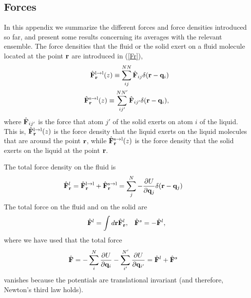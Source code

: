 \documentclass[b5paper,openright,10pt]{book}
\begin{document}
\begin{appendices}
\chapter{Forces}  
\label{Ap:Forces}
In this appendix we summarize the different forces and force densities
introduced so far, and present  some results  concerning its
averages  with the relevant  ensemble.  The  force densities  that the
fluid or the solid exert on a fluid molecule located at the point ${\bf
  r}$ are introduced in (\ref{Fr}),
\begin{eqnarray}
  \hat{\bf F}^{\rm l\to l}_{\bf r}(z) \equiv \sum^{NN}_{ij}\hat{\bf F}_{ij}\delta({\bf r}-{\bf q}_i)
\nonumber\\
\hat{\bf F}^{\rm s\to l}_{\bf r}(z) \equiv \sum^{NN'}_{ij'}\hat{\bf F}_{ij'}\delta({\bf r}-{\bf q}_i),
\label{Fr_ap}
\end{eqnarray}
where $\hat{\bf  F}_{ij'}$ is the  force that  atom $j'$ of  the solid
exerts on  atom $i$ of  the liquid.   This is, $\hat{\bf  F}^{\rm l\to
  l}_{\bf r}(z) $  is the force density that the  liquid exerts on the
liquid molecules that are around  the point ${\bf r}$, while $\hat{\bf
  F}^{\rm  s\to l}_{\bf  r}(z)$ is  the force  density that  the solid
exerts on the liquid at the point ${\bf r}$.

The total force density on the fluid is
\begin{align}
  \hat{\bf F}^l_{\bf r}&=\hat{\bf F}^{\rm l\to l}_{\bf r}+\hat{\bf F}^{\rm s\to l}_{\bf r} =\sum^{N}_{j}-\frac{\partial U}{\partial {\bf q}_{j}}\delta({\bf r}-{\bf q}_j)
\end{align}
The total force on the fluid and on the solid are
\begin{align}
  \hat{\bf F}^l=\int d{\bf r}\hat{\bf F}^l_{\bf r}, &&
  \hat{\bf F}^s= -\hat{\bf F}^l,
\end{align}
where we have used that the total force
\begin{align}
  \hat{\bf F}&=-\sum^N_{i}\frac{\partial U}{\partial {\bf q}_i}
-\sum^{N'}_{i'}\frac{\partial U}{\partial {\bf q}_{i'}}
=\hat{\bf F}^l+\hat{\bf F}^s
\end{align}
 vanishes because the  potentials are translational invariant (and
therefore, Newton's third law holds).


\end{appendices}
\end{document}
